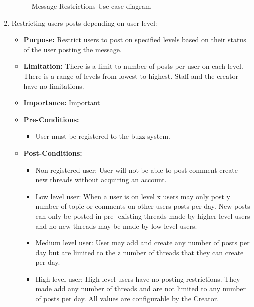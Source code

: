 \documentclass[11pt]{article}
\begin{document}
\begin{enumerate}
\begin{figure}[H]
    	\caption{Message Restrictions Use case diagram}
	\end{figure}
































\item  Restricting users posts depending on user level:
\begin{itemize}	
		\item \textbf{Purpose:} Restrict users to post on specified levels based on their status of the user posting the message.
		\item\textbf{Limitation: }There is a limit to number of posts per user on each level.
		 There is a range of levels from lowest to highest.
		 Staff and the creator have no limitations.
		\item\textbf{Importance:} Important

		\item\textbf{Pre-Conditions: }
		\begin{itemize}
			 \item User must be registered to the buzz system.
		 \end{itemize}
		 
		\item\textbf{Post-Conditions: }
		\begin{itemize}
			\item Non-registered user:
			User will not be able to post comment create new threads without acquiring an account.
			\item Low level user:
			When a user is on level x users may only post y number of topic or comments on other users posts per day. New posts can only be posted in pre-		existing threads made by higher level users and no new threads may be made by low level users. 
			\item Medium level user:
			User may add and create any number of posts per day but are limited to the z number of threads that they can create per day.
			\item High level user:
			High level users have no posting restrictions. They made add any number of threads and are not limited to any number of posts per day.
		 	All values are configurable by the Creator.
		 \end{itemize}


\end{itemize}
\end{enumerate}
\end{document}
